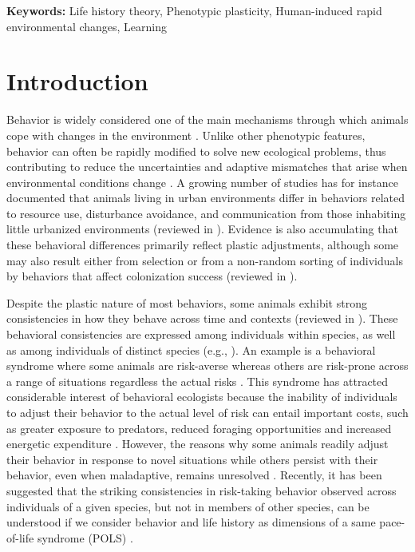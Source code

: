 \bigskip
\textbf{Keywords:} Life history theory, Phenotypic plasticity, Human-induced rapid
environmental changes, Learning

\clearpage


\section{Introduction}

Behavior is widely considered one of the main mechanisms
through which animals cope with changes in the environment
\citep{Bogert1949, Klopfer1962, mayr1965}. Unlike other phenotypic
features, behavior can often be rapidly modified to solve
new ecological problems, thus contributing to reduce the uncertainties
and adaptive mismatches that arise when environmental 
conditions change \citep{Huey2003, Price2003, Estrada2016, Sol2016}. 
A growing number
of studies has for instance documented that animals living
in urban environments differ in behaviors related to resource
use, disturbance avoidance, and communication from those
inhabiting little urbanized environments (reviewed in 
\citet{Shochat2006, Evans2012, Lowry2013, Sol2013a}). 
Evidence is also accumulating that these behavioral differences
primarily reflect plastic adjustments, although some
may also result either from selection or from a non-random
sorting of individuals by behaviors that affect colonization success
(reviewed in \citet{Sol2013a}).

Despite the plastic nature of most behaviors, some animals
exhibit strong consistencies in how they behave across time
and contexts (reviewed in \citet{Sih2004, Reale2007}).
These behavioral consistencies are expressed among individuals
within species, as well as among individuals of distinct
species (e.g., \citet{Moller1994, Verbeek1994, Koolhaas1999, Gosling2001, Greenberg2003, Sih2004, Reale2007}).
An example is a behavioral syndrome where
some animals are risk-averse whereas others are risk-prone
across a range of situations regardless the actual risks \citep{Sih2004, Sih2012a}.
This syndrome has attracted considerable
interest of behavioral ecologists because the inability of individuals
to adjust their behavior to the actual level of risk can
entail important costs, such as greater exposure to predators,
reduced foraging opportunities and increased energetic expenditure
\citep{Sih2004, Sih2012a}. However, the reasons why some
animals readily adjust their behavior in response to novel situations
while others persist with their behavior, even when maladaptive,
remains unresolved \citep{Sih2004}. Recently, it has
been suggested that the striking consistencies in risk-taking
behavior observed across individuals of a given species, but
not in members of other species, can be understood if we consider
behavior and life history as dimensions of a same pace-of-life
syndrome (POLS) \citep{Wolf2007, Reale2010a}.


